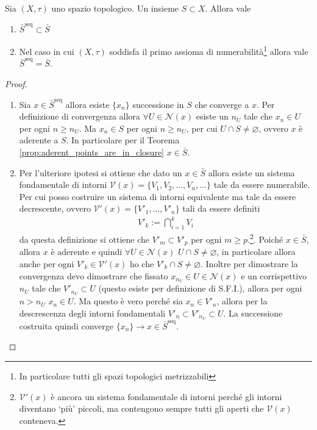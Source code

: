 \begin{theorem}
	Sia $(X,\tau)$ uno spazio topologico. Un insieme $S \subset X$. Allora vale \begin{enumerate}
		\item $\bar{S}^\text{seq} \subset \bar{S}$
		\item Nel caso in cui $(X, \tau)$ soddisfa il primo assioma di numerabilità\footnote{In particolare tutti gli spazi topologici metrizzabili} allora vale $\bar{S}^\text{seq} = \bar{S}$.
	\end{enumerate}
\end{theorem}
\begin{proof}
	\begin{enumerate}
		\item Sia $x \in \bar{S}^\text{seq}$ allora esiste $\{x_n\}$ successione in $S$ che converge a $x$. Per definizione di convergenza allora $\forall U \in \mathcal{N}(x)$ esiste un $n_U$ tale che $x_n \in U$ per ogni $n \ge n_U$. Ma $x_n \in S$ per ogni $n \ge n_U$, per cui $U \cap S \neq \varnothing$, ovvero $x$ è aderente a $S$. In particolare per il Teorema \ref{prop:aderent_points_are_in_closure} $x \in \bar{S}$. 
		\item Per l'ulteriore ipotesi si ottiene che dato un $x \in \bar{S}$ allora esiste un sistema fondamentale di intorni $\mathcal{V}(x) = \{V_1, V_2, \dots, V_n, \dots\}$ tale da essere numerabile. Per cui posso costruire un sistema di intorni equivalente ma tale da essere decrescente, ovvero $\mathcal{V}'(x) = \{V'_1, \dots, V'_n\}$ tali da essere definiti 
		\begin{equation}
		\begin{aligned}
			V'_k := \bigcap^k_{i=1} V_i
		\end{aligned}
		\end{equation}
		da questa definizione si ottiene che $V'_{m} \subset V'_p$ per ogni $m \ge p$.\footnote{$\mathcal{V}'(x)$ è ancora un sistema fondamentale di intorni perché gli intorni diventano `più' piccoli, ma contengono sempre tutti gli aperti che $\mathcal{V}(x)$ conteneva.}.
		Poiché $x \in \bar{S}$, allora $x$ è aderente e quindi $\forall U \in \mathcal{N}(x)$ $U \cap S \neq \varnothing$, in particolare allora anche per ogni $V'_k \in \mathcal{V}'(x)$ ho che $V'_k \cap S \neq \varnothing$. Inoltre per dimostrare la convergenza devo dimostrare che fissato $x_{n_U} \in U \in \mathcal{N}(x)$ e un corrispettivo $n_U$ tale che $V'_{n_U} \subset U$ (questo esiste per definizione di S.F.I.), allora per ogni $n > n_U$ $x_n \in U$. Ma questo è vero perché sia $x_n \in V'_n$, allora per la descrescenza degli intorni fondamentali $V'_{n} \subset V'_{n_U} \subset U$. La successione costruita quindi converge $\{x_n\} \rightarrow x \in \bar{S}^\text{seq}$.
	\end{enumerate}
\end{proof}

